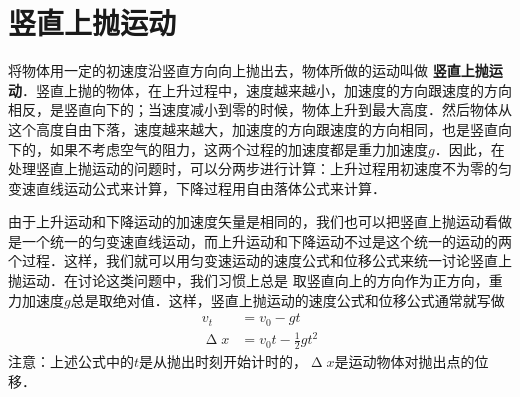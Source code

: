 \section{竖直上抛运动}
将物体用一定的初速度沿竖直方向向上抛出去，物体所做的运动叫做\textbf{ 竖直上抛运动}．竖直上抛的物体，在上升过程中，速度越来越小，加速度的方向跟速度的方向相反，是竖直向下的；当速度减小到零的时候，物体上升到最大高度．然后物体从这个高度自由下落，速度越来越大，加速度的方向跟速度的方向相同，也是竖直向下的，如果不考虑空气的阻力，这两个过程的加速度都是重力加速度$g$．因此，在处理竖直上抛运动的问题时，可以分两步进行计算：上升过程用初速度不为零的匀变速直线运动公式来计算，下降过程用自由落体公式来计算．

由于上升运动和下降运动的加速度矢量是相同的，我们也可以把竖直上抛运动看做是一个统一的匀变速直线运动，而上升运动和下降运动不过是这个统一的运动的两个过程．这样，我们就可以用匀变速运动的速度公式和位移公式来统一讨论竖直上抛运动．在讨论这类问题中，我们习惯上总是
取竖直向上的方向作为正方向，重力加速度$g$总是取绝对值．这样，竖直上抛运动的速度公式和位移公式通常就写做
\[\begin{split}
        v_t        & =v_0-gt                \\
        \upDelta x & =v_0 t-\frac{1}{2}gt^2
    \end{split}\]
注意：上述公式中的$t$是从抛出时刻开始计时的，$\upDelta x$是运动物体对抛出点的位移．

